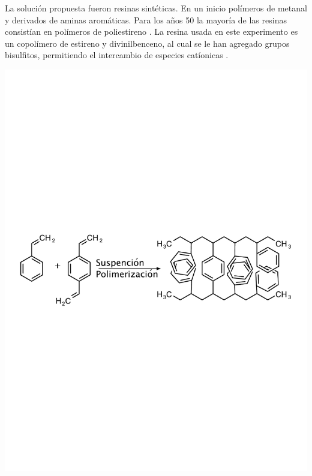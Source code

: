\documentclass[fleqn,10pt]{SelfArx} %
\begin{document}
	La soluci\'on propuesta fueron resinas sint\'eticas. En un inicio pol\'imeros de metanal y derivados de aminas arom\'aticas. Para los a\~nos 50 la mayor\'ia de las resinas consist\'ian en pol\'imeros de poliestireno \cite{Chen}. La resina usada en este experimento es un copol\'imero de estireno y divinilbenceno, al cual se le han agregado grupos bisulfitos, permitiendo el intercambio de especies cat\'ionicas \cite{DOWEX}. 
	\begin{scheme}[h]
	    \centering
	    \includegraphics[width=\linewidth]{images/Resina.pdf}

\end{scheme}
\end{document}
